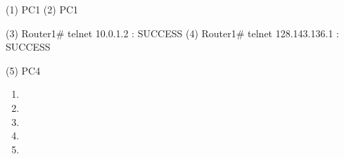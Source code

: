 (1) PC1%
(2) PC1%

(3) Router1# telnet 10.0.1.2		: SUCCESS
(4) Router1# telnet 128.143.136.1	: SUCCESS

(5) PC4%

\begin{enumerate}
\item 
\item 
\item 
\item 
\item 
\end{enumerate}